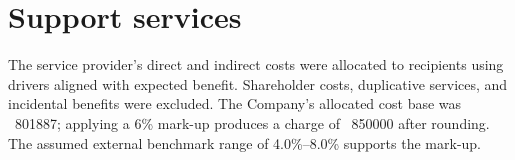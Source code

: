 \section{Support services}
The service provider's direct and indirect costs were allocated to recipients
using drivers aligned with expected benefit. Shareholder costs, duplicative
services, and incidental benefits were excluded. The Company's allocated cost
base was \Currency\ \num{801887}; applying a 6\% mark-up produces a charge of
\Currency\ \num{850000} after rounding. The assumed external benchmark range of
4.0\%--8.0\% supports the mark-up.
